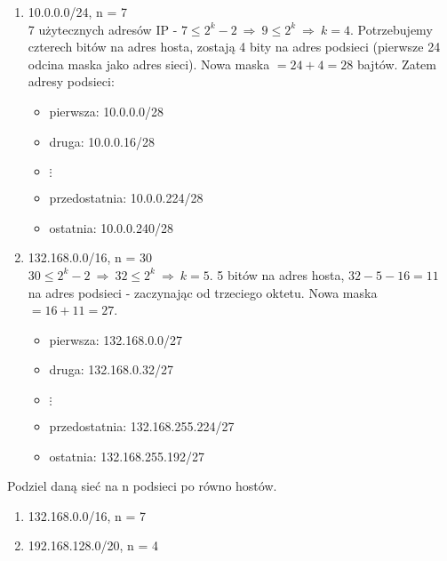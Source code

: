 \documentclass[main.tex]{subfiles}
\begin{document}
    \begin{enumerate}
        \item 10.0.0.0/24, n = 7\\
        7 użytecznych adresów IP - $7 \leq 2^k - 2 ~ \Rightarrow ~ 9 \leq 2^k ~ \Rightarrow ~ k = 4$. Potrzebujemy czterech
        bitów na adres hosta, zostają 4 bity na adres podsieci (pierwsze 24 odcina maska jako adres sieci). Nowa maska
        $= 24 + 4 = 28$ bajtów. Zatem adresy podsieci:
        \begin{itemize}
            \item pierwsza: 10.0.0.0/28
            \item druga: 10.0.0.16/28
            \item $\vdots$
            \item przedostatnia: 10.0.0.224/28
            \item ostatnia: 10.0.0.240/28
        \end{itemize}

        \item 132.168.0.0/16, n = 30\\
        $30 \leq 2^k - 2 ~ \Rightarrow ~ 32 \leq 2^k ~ \Rightarrow ~ k = 5$. 5 bitów na adres hosta, $32-5-16 = 11$ na adres
        podsieci - zaczynając od trzeciego oktetu. Nowa maska $= 16 + 11 = 27$.
        \begin{itemize}
            \item pierwsza: 132.168.0.0/27
            \item druga: 132.168.0.32/27
            \item $\vdots$
            \item przedostatnia: 132.168.255.224/27
            \item ostatnia: 132.168.255.192/27
        \end{itemize}
    \end{enumerate}

    \begin{exercise}
        Podziel daną sieć na n podsieci po równo hostów.
        \begin{enumerate}
            \item 132.168.0.0/16, n = 7
            \item 192.168.128.0/20, n = 4
        \end{enumerate}
    \end{exercise}
\end{document}
